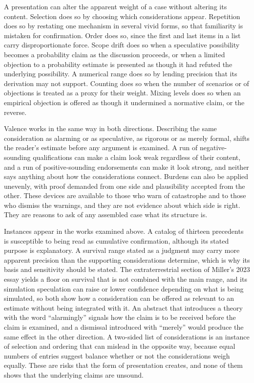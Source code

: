 \documentclass[11pt]{article}
\begin{document}
A presentation can alter the apparent weight of a case without altering its content. Selection does so by choosing which considerations appear. Repetition does so by restating one mechanism in several vivid forms, so that familiarity is mistaken for confirmation. Order does so, since the first and last items in a list carry disproportionate force. Scope drift does so when a speculative possibility becomes a probability claim as the discussion proceeds, or when a limited objection to a probability estimate is presented as though it had refuted the underlying possibility. A numerical range does so by lending precision that its derivation may not support. Counting does so when the number of scenarios or of objections is treated as a proxy for their weight. Mixing levels does so when an empirical objection is offered as though it undermined a normative claim, or the reverse.

Valence works in the same way in both directions. Describing the same consideration as alarming or as speculative, as rigorous or as merely formal, shifts the reader's estimate before any argument is examined. A run of negative-sounding qualifications can make a claim look weak regardless of their content, and a run of positive-sounding endorsements can make it look strong, and neither says anything about how the considerations connect. Burdens can also be applied unevenly, with proof demanded from one side and plausibility accepted from the other. These devices are available to those who warn of catastrophe and to those who dismiss the warnings, and they are not evidence about which side is right. They are reasons to ask of any assembled case what its structure is.

Instances appear in the works examined above. A catalog of thirteen precedents is susceptible to being read as cumulative confirmation, although its stated purpose is explanatory. A survival range stated as a judgment may carry more apparent precision than the supporting considerations determine, which is why its basis and sensitivity should be stated. The extraterrestrial section of Miller's 2023 essay yields a floor on survival that is not combined with the main range, and its simulation speculation can raise or lower confidence depending on what is being simulated, so both show how a consideration can be offered as relevant to an estimate without being integrated with it. An abstract that introduces a theory with the word ``alarmingly'' signals how the claim is to be received before the claim is examined, and a dismissal introduced with ``merely'' would produce the same effect in the other direction. A two-sided list of considerations is an instance of selection and ordering that can mislead in the opposite way, because equal numbers of entries suggest balance whether or not the considerations weigh equally. These are risks that the form of presentation creates, and none of them shows that the underlying claims are unsound.
\end{document}
